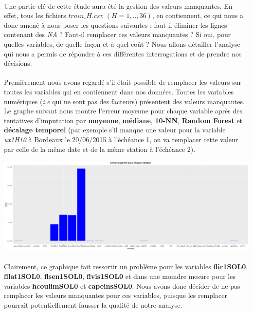 \documentclass[14pt, openany]{article}
\begin{document}
\paragraph{}
Une partie clé de cette étude aura été la gestion des valeurs manquantes. En effet, tous les fichiers $train\_H.csv$ $(H=1,..,36)$, en contiennent, ce qui nous a donc amené à nous poser les questions suivantes : faut-il éliminer les lignes contenant des \textit{NA} ? Faut-il remplacer ces valeurs manquantes ? Si oui, pour quelles variables, de quelle façon et à quel coût ? Nous allons détailler l'analyse qui nous a permis de répondre à ces différentes interrogations et de prendre nos décisions.
\paragraph{}
Premièrement nous avons regardé s'il était possible de remplacer les valeurs sur toutes les variables qui en contiennent dans nos données. Toutes les variables numériques (\textit{i.e} qui ne sont pas des facteurs) présentent des valeurs manquantes. Le graphe suivant nous montre l'erreur moyenne pour chaque variable après des tentatives d'imputation par \textbf{moyenne}, \textbf{médiane}, \textbf{10-NN}, \textbf{Random Forest} et \textbf{décalage temporel} (par exemple s'il manque une valeur pour la variable \textit{ux1H10} à Bordeaux le 20/06/2015 à l'échéance 1, on va remplacer cette valeur par celle de la même date et de la même station à l'échéance 2).

\includegraphics[width=17cm]{Images/na_error.png}
\begin{center}
\label{fig1}
\end{center}
\paragraph{}
Clairement, ce graphique fait ressortir un problème pour les variables \textbf{flir1SOL0}, \textbf{fllat1SOL0}, \textbf{flsen1SOL0}, \textbf{flvis1SOL0} et dans une moindre mesure pour les variables \textbf{hcoulimSOL0} et \textbf{capeinsSOL0}. Nous avons donc décider de ne pas remplacer les valeurs manquantes pour ces variables, puisque les remplacer pourrait potentiellement fausser la qualité de notre analyse.
\end{document}
